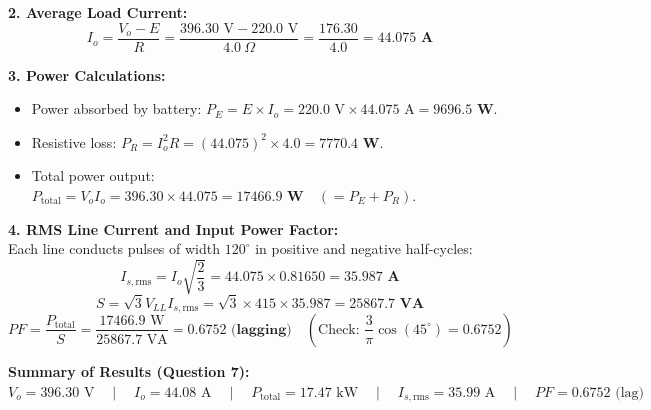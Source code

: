 \documentclass[10pt,a4paper]{article}
\begin{document}
\noindent\textbf{2. Average Load Current:}\\
\[
I_o = \frac{V_o - E}{R} = \frac{396.30\text{ V} - 220.0\text{ V}}{4.0\ \Omega} = \frac{176.30}{4.0} = \mathbf{44.075\text{ A}}
\]

\noindent\textbf{3. Power Calculations:}\\
\begin{itemize}
  \item Power absorbed by battery: $P_E = E \times I_o = 220.0\text{ V} \times 44.075\text{ A} = \mathbf{9696.5\text{ W}}$.
  \item Resistive loss: $P_R = I_o^2 R = (44.075)^2 \times 4.0 = \mathbf{7770.4\text{ W}}$.
  \item Total power output: $P_{\text{total}} = V_o I_o = 396.30 \times 44.075 = \mathbf{17466.9\text{ W}} \quad (= P_E + P_R)$.
\end{itemize}

\noindent\textbf{4. RMS Line Current and Input Power Factor:}\\
Each line conducts pulses of width $120^\circ$ in positive and negative half-cycles:
\[
I_{s,\text{rms}} = I_o \sqrt{\frac{2}{3}} = 44.075 \times 0.81650 = \mathbf{35.987\text{ A}}
\]
\[
S = \sqrt{3} V_{LL} I_{s,\text{rms}} = \sqrt{3} \times 415 \times 35.987 = \mathbf{25867.7\text{ VA}}
\]
\[
PF = \frac{P_{\text{total}}}{S} = \frac{17466.9\text{ W}}{25867.7\text{ VA}} = \mathbf{0.6752\text{ (lagging)}} \quad \left(\text{Check: } \frac{3}{\pi}\cos(45^\circ) = 0.6752\right)
\]

\begin{tcolorbox}[resbox]
\textbf{\textcolor{accentcyan}{Summary of Results (Question 7):}}\\
$V_o = 396.30\text{ V} \quad\mid\quad I_o = 44.08\text{ A} \quad\mid\quad P_{\text{total}} = 17.47\text{ kW} \quad\mid\quad I_{s,\text{rms}} = 35.99\text{ A} \quad\mid\quad PF = 0.6752\text{ (lag)}$
\end{tcolorbox}

\vspace{4mm}
\end{document}

